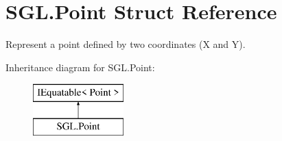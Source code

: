 \hypertarget{struct_s_g_l_1_1_point}{}\section{S\+G\+L.\+Point Struct Reference}
\label{struct_s_g_l_1_1_point}


Represent a point defined by two coordinates (X and Y).  


Inheritance diagram for S\+G\+L.\+Point\+:\begin{figure}[H]
\begin{center}
\leavevmode
\includegraphics[height=2.000000cm]{struct_s_g_l_1_1_point}
\end{center}
\end{figure}
